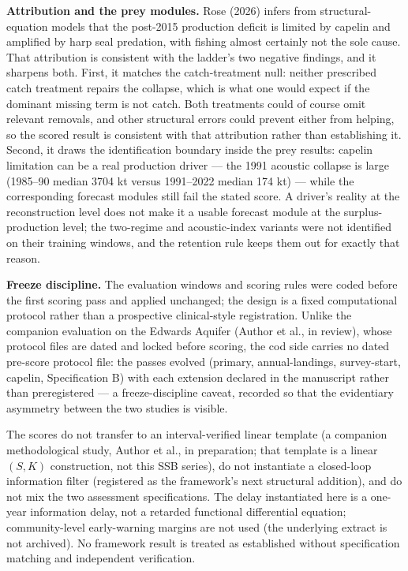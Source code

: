\documentclass[11pt]{article}
\begin{document}
\textbf{Attribution and the prey modules.} Rose (2026) infers from
structural-equation models that the post-2015 production deficit is
limited by capelin and amplified by harp seal predation, with fishing
almost certainly not the sole cause. That attribution is consistent with
the ladder's two negative findings, and it sharpens both. First, it
matches the catch-treatment null: neither prescribed catch treatment
repairs the collapse, which is what one would expect if the dominant
missing term is not catch. Both treatments could of course omit relevant
removals, and other structural errors could prevent either from helping,
so the scored result is consistent with that attribution rather than
establishing it. Second, it draws the
identification boundary inside the prey results: capelin limitation can
be a real production driver --- the 1991 acoustic collapse is large
(1985--90 median 3704 kt versus 1991--2022 median 174 kt) --- while the
corresponding forecast modules still fail the stated score. A driver's
reality at the reconstruction level does not make it a usable forecast
module at the surplus-production level; the two-regime and
acoustic-index variants were not identified on their training windows,
and the retention rule keeps them out for exactly that reason.

\textbf{Freeze discipline.} The evaluation windows and scoring rules
were coded before the first scoring pass and applied unchanged; the
design is a fixed computational protocol rather than a prospective
clinical-style registration. Unlike the companion evaluation on the
Edwards Aquifer (Author et al., in review), whose protocol files are
dated and locked before scoring, the cod side carries no dated pre-score
protocol file: the passes evolved (primary, annual-landings,
survey-start, capelin, Specification B) with each extension declared in
the manuscript rather than preregistered --- a freeze-discipline caveat,
recorded so that the evidentiary asymmetry between the two studies is
visible.

The scores do not transfer to an interval-verified linear template (a
companion methodological study, Author et al., in preparation; that
template is a linear \((S,K)\) construction, not this SSB series), do
not instantiate a closed-loop information filter (registered as the
framework's next structural addition), and do not mix the two assessment
specifications. The delay instantiated here is a one-year information
delay, not a retarded functional differential equation; community-level
early-warning margins are not used (the underlying extract is not
archived). No framework result is treated as established without
specification matching and independent verification.
\end{document}
